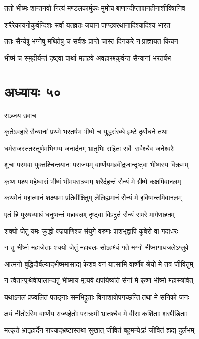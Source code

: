 \twolineshloka
{ततो भीष्मः शान्तनवो नित्यं मण्डलकार्मुकः}
{मुमोच बाणान्दीप्ताग्रानहीनाशीविषानिव}


\twolineshloka
{शरैरेकायनीकुर्वन्दिशः सर्वा यतव्रतः}
{जघान पाण्डवरथानादिश्यादिश्य भारत}


\twolineshloka
{ततः सैन्येषु भग्नेषु मथितेषु च सर्वशः}
{प्राप्ते चास्तं दिनकरे न प्राज्ञायत किंचन}


\twolineshloka
{भीष्मं च समुदीर्यन्तं दृष्ट्वा पार्था महाहवे}
{अवहारमकुर्वन्त सैन्यानां भरतर्षभ}


\chapter{अध्यायः ५०}
\twolineshloka
{सञ्जय उवाच}
{}


\twolineshloka
{कृतेऽवहारे सैन्यानां प्रथमे भरतर्षभ}
{भीष्मे च युद्धसंरब्धे हृष्टे दुर्योधने तथा}


\twolineshloka
{धर्मराजस्ततस्तूर्णमभिगम्य जनार्दनम्}
{भ्रातृभिः सहितः सर्वैः सर्वैश्चैव जनेश्वरैः}


\twolineshloka
{शुचा परमया युक्तश्चिन्तयानः पराजयम्}
{वार्ष्णेयमब्रवीद्रजान्दृष्ट्वा भीष्मस्य विक्रमम्}


\twolineshloka
{कृष्ण पश्य महेष्वासं भीष्मं भीमपराक्रमम्}
{शरैर्दहन्तं सैन्यं मे ग्रीष्मे कक्षमिवानलम्}


\twolineshloka
{कथमेनं महात्मानं शक्ष्यामः प्रतिवीक्षितुम्}
{लेलिह्यमानं सैन्यं मे हविष्मन्तमिवानलम्}


\twolineshloka
{एतं हि पुरुषव्याघ्रं धनुष्मन्तं महाबलम्}
{दृष्ट्वा विप्रद्रुर्त सैन्यं समरे मार्गणाहतम्}


\twolineshloka
{शक्यो जेतुं यमः क्रुद्धो वज्रपाणिश्च संयुगे}
{वरुणः पाशभृद्वापि कुबेरो वा गदाधरः}


\twolineshloka
{न तु भीष्मो महाजेताः शक्यो जेतुं महाबलः}
{सोऽहमेवं गते मग्नो भीष्मागाधजलेऽप्लुवे}


\twolineshloka
{आत्मनो बुद्धिदौर्बल्याद्भीष्ममासाद्य केशव}
{वनं यात्सामि वार्ष्णेय श्रेयो मे तत्र जीवितुम्}


\twolineshloka
{न त्वेतान्पृथिवीपालान्दातुं भीष्माय मृत्यवे}
{क्षपयिष्यति सेनां मे कृष्ण भीष्मो महास्त्रवित्}


\twolineshloka
{यथाऽनलं प्रज्वलितं पतङ्गाः समभिद्रुताः}
{विनाशायोपगच्छन्ति तथा मे सनिको जनः}


\twolineshloka
{क्षयं नीतोऽस्मि वार्ष्णेय राज्यहेतोः पराक्रमी}
{भ्रातश्चैव मे वीराः कर्शिताः शरपीडिताः}


\twolineshloka
{मत्कृते भ्रातृहार्देन राज्याद्भ्रष्टास्तथा सुखात्}
{जीवितं बहुमन्येऽहं जीवितं ह्यद्य दुर्लभम्}


